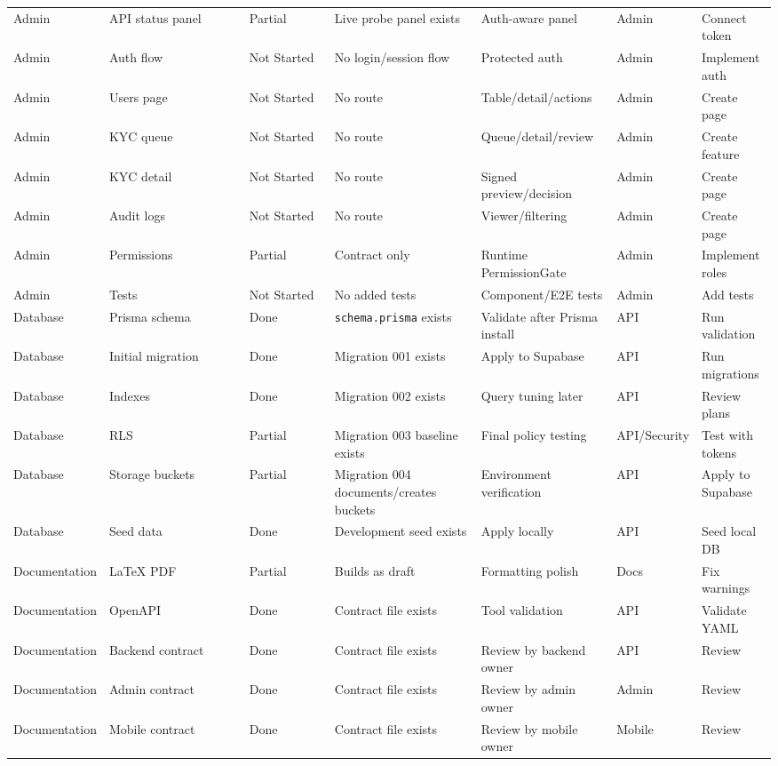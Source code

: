\begin{longtable}{p{0.12\linewidth}p{0.2\linewidth}p{0.12\linewidth}p{0.2\linewidth}p{0.18\linewidth}p{0.08\linewidth}p{0.14\linewidth}}
Admin & API status panel & Partial & Live probe panel exists & Auth-aware panel & Admin & Connect token \\
Admin & Auth flow & Not Started & No login/session flow & Protected auth & Admin & Implement auth \\
Admin & Users page & Not Started & No route & Table/detail/actions & Admin & Create page \\
Admin & KYC queue & Not Started & No route & Queue/detail/review & Admin & Create feature \\
Admin & KYC detail & Not Started & No route & Signed preview/decision & Admin & Create page \\
Admin & Audit logs & Not Started & No route & Viewer/filtering & Admin & Create page \\
Admin & Permissions & Partial & Contract only & Runtime PermissionGate & Admin & Implement roles \\
Admin & Tests & Not Started & No added tests & Component/E2E tests & Admin & Add tests \\
Database & Prisma schema & Done & \texttt{schema.prisma} exists & Validate after Prisma install & API & Run validation \\
Database & Initial migration & Done & Migration 001 exists & Apply to Supabase & API & Run migrations \\
Database & Indexes & Done & Migration 002 exists & Query tuning later & API & Review plans \\
Database & RLS & Partial & Migration 003 baseline exists & Final policy testing & API/Security & Test with tokens \\
Database & Storage buckets & Partial & Migration 004 documents/creates buckets & Environment verification & API & Apply to Supabase \\
Database & Seed data & Done & Development seed exists & Apply locally & API & Seed local DB \\
Documentation & LaTeX PDF & Partial & Builds as draft & Formatting polish & Docs & Fix warnings \\
Documentation & OpenAPI & Done & Contract file exists & Tool validation & API & Validate YAML \\
Documentation & Backend contract & Done & Contract file exists & Review by backend owner & API & Review \\
Documentation & Admin contract & Done & Contract file exists & Review by admin owner & Admin & Review \\
Documentation & Mobile contract & Done & Contract file exists & Review by mobile owner & Mobile & Review \\

\end{longtable}
